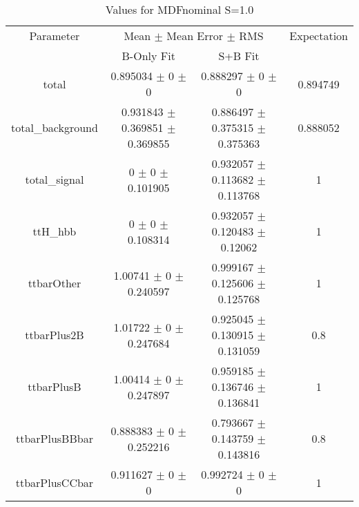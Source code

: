 \begin{table}
\centering
\caption{Values for MDFnominal S=1.0}
\begin{tabular}{cccc}
\toprule
Parameter & \multicolumn{2}{c}{Mean $\pm$ Mean Error $\pm$ RMS} & Expectation\\
 & B-Only Fit & S+B Fit & \\
\midrule
total & \num{0.895034} $\pm$ \num{0} $\pm$ \num{0} & \num{0.888297} $\pm$ \num{0} $\pm$ \num{0} & \num{0.894749}\\
total\_background & \num{0.931843} $\pm$ \num{0.369851} $\pm$ \num{0.369855} & \num{0.886497} $\pm$ \num{0.375315} $\pm$ \num{0.375363} & \num{0.888052}\\
total\_signal & \num{0} $\pm$ \num{0} $\pm$ \num{0.101905} & \num{0.932057} $\pm$ \num{0.113682} $\pm$ \num{0.113768} & \num{1}\\
ttH\_hbb & \num{0} $\pm$ \num{0} $\pm$ \num{0.108314} & \num{0.932057} $\pm$ \num{0.120483} $\pm$ \num{0.12062} & \num{1}\\
ttbarOther & \num{1.00741} $\pm$ \num{0} $\pm$ \num{0.240597} & \num{0.999167} $\pm$ \num{0.125606} $\pm$ \num{0.125768} & \num{1}\\
ttbarPlus2B & \num{1.01722} $\pm$ \num{0} $\pm$ \num{0.247684} & \num{0.925045} $\pm$ \num{0.130915} $\pm$ \num{0.131059} & \num{0.8}\\
ttbarPlusB & \num{1.00414} $\pm$ \num{0} $\pm$ \num{0.247897} & \num{0.959185} $\pm$ \num{0.136746} $\pm$ \num{0.136841} & \num{1}\\
ttbarPlusBBbar & \num{0.888383} $\pm$ \num{0} $\pm$ \num{0.252216} & \num{0.793667} $\pm$ \num{0.143759} $\pm$ \num{0.143816} & \num{0.8}\\
ttbarPlusCCbar & \num{0.911627} $\pm$ \num{0} $\pm$ \num{0} & \num{0.992724} $\pm$ \num{0} $\pm$ \num{0} & \num{1}\\
\bottomrule
\end{tabular}
\end{table}